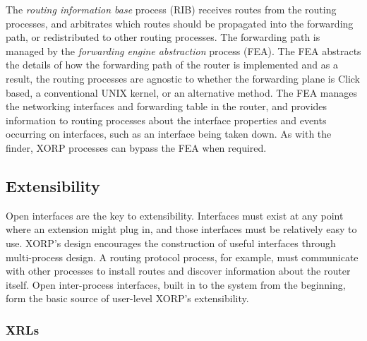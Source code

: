 

The \emph{routing information base} process (RIB) receives routes from
the routing processes, and arbitrates which routes should be
propagated into the forwarding path, or redistributed to other routing
processes.  The forwarding path is managed
by the \emph{forwarding engine abstraction} process (FEA).  The FEA
abstracts the details of how the forwarding path of the router is
implemented and as a result, the routing processes are agnostic to
whether the forwarding plane is Click based, a conventional UNIX
kernel, or an alternative method.  The FEA manages the networking
interfaces and forwarding table in the router, and provides information to routing processes
about the interface properties and events occurring on interfaces, such as an
interface being taken down.  As with the finder, XORP processes can bypass the
FEA when required.


\subsection{Extensibility}

Open interfaces are the key to extensibility.
Interfaces must exist at any point where an extension might plug in,
and those interfaces must be relatively easy to use.
XORP's design encourages the construction of useful
interfaces through multi-process design.
A routing protocol process, for example, must communicate with other
processes to install routes and discover information about the router
itself.
Open inter-process interfaces, built in to the system from the beginning,
form the basic source of user-level XORP's extensibility.

\subsubsection{XRLs}
\def\xrl#1{\textsf{\small #1}}

